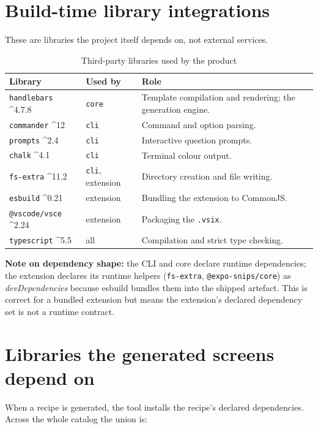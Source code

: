 \section{Build-time library integrations}

These are libraries the project itself depends on, not external services.

\begin{longtable}{p{3.2cm}p{3cm}p{6.4cm}}
\caption{Third-party libraries used by the product}\\
\toprule
\textbf{Library} & \textbf{Used by} & \textbf{Role} \\
\midrule

\texttt{handlebars} \^{}4.7.8 & \texttt{core} & Template compilation and
rendering; the generation engine. \\
\texttt{commander} \^{}12 & \texttt{cli} & Command and option parsing. \\
\texttt{prompts} \^{}2.4 & \texttt{cli} & Interactive question prompts. \\
\texttt{chalk} \^{}4.1 & \texttt{cli} & Terminal colour output. \\
\texttt{fs-extra} \^{}11.2 & \texttt{cli}, extension & Directory creation and file
writing. \\
\texttt{esbuild} \^{}0.21 & extension & Bundling the extension to CommonJS. \\
\texttt{@vscode/vsce} \^{}2.24 & extension & Packaging the \texttt{.vsix}. \\
\texttt{typescript} \^{}5.5 & all & Compilation and strict type checking. \\
\bottomrule
\end{longtable}

\textbf{Note on dependency shape:} the CLI and core declare runtime
dependencies; the extension declares its runtime helpers (\texttt{fs-extra},
\texttt{@expo-snips/core}) as \emph{devDependencies} because esbuild bundles them
into the shipped artefact. This is correct for a bundled extension but means the
extension's declared dependency set is not a runtime contract.

\section{Libraries the generated screens depend on}

When a recipe is generated, the tool installs the recipe's declared
dependencies. Across the whole catalog the union is:

